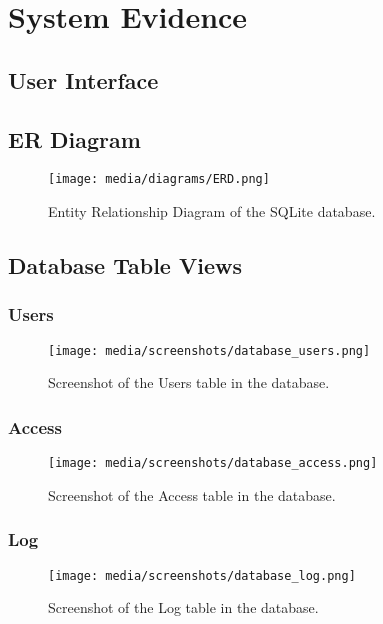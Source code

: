 \documentclass[12pt,a4paper]{report}
\begin{document}
\section{System Evidence}
    \subsection{User Interface}
    \subsection{ER Diagram}
    \begin{figure}[H]
        \caption{Entity Relationship Diagram of the SQLite database.}
        \centering
        \texttt{[image: media/diagrams/ERD.png]}
    \end{figure}

    \subsection{Database Table Views}
        \subsubsection{Users}
            \begin{figure}[H]
                \caption{Screenshot of the Users table in the database.}
                \centering
                \texttt{[image: media/screenshots/database\_users.png]}
            \end{figure}

        \subsubsection{Access}
            \begin{figure}[H]
                \caption{Screenshot of the Access table in the database.}
                \centering
                \texttt{[image: media/screenshots/database\_access.png]}
            \end{figure}

        \subsubsection{Log}
            \begin{figure}[H]
                \caption{Screenshot of the Log table in the database.}
                \centering
                \texttt{[image: media/screenshots/database\_log.png]}
            \end{figure}
\end{document}
